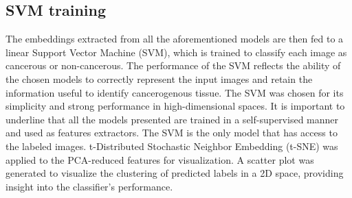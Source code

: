 \documentclass[peerreview]{IEEEtran}
\begin{document}
\subsection{SVM training}
The embeddings extracted from all the aforementioned models are then fed to a linear Support Vector Machine (SVM), which is trained to classify each image as cancerous or non-cancerous.
The performance of the SVM reflects the ability of the chosen models to correctly represent the input images and retain the information useful to identify cancerogenous tissue. The SVM was chosen for its simplicity and strong performance in high-dimensional spaces. It is important to underline that all the models presented are trained in a self-supervised manner and used as features extractors. The SVM is the only model that has access to the labeled images. t-Distributed Stochastic Neighbor Embedding (t-SNE) was applied to the PCA-reduced features for visualization. A scatter plot was generated to visualize the clustering of predicted labels in a 2D space, providing insight into the classifier's performance.
\end{document}
